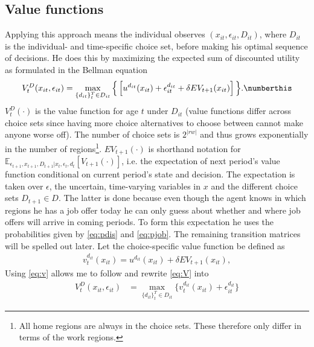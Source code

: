 \subsection{Value functions}
Applying this approach means the individual observes $(x_{it},\epsilon_{it}, D_{it})$, where $D_{it}$ is the individual- and time-specific choice set, before making his optimal sequence of decisions. He does this by maximizing the expected sum of discounted utility as formulated in the Bellman equation 
\begin{align}
V_t^D(x_{it},\epsilon_{it})=  \max_{\{d_{it}\}_{t}^{T}\in D_{it}} \Big\{\left[u^{d_{it}}(x_{it})+ \epsilon_{it}^{d_{it}}+\delta EV_{t+1}(x_{it}) \right]\Big\}. 
 \numberthis \label{eq:V}
\end{align}
$V_t^D(\cdot)$ is the value function for age $t$ under $D_{it}$ (value functions differ across choice sets since having more choice alternatives to choose between cannot make anyone worse off). The number of choice sets is $2^{|rw|}$ and thus grows exponentially in the number of regions\footnote{All home regions are always in the choice sets. These therefore only differ in terms of the work regions.}. $EV_{t+1}(\cdot)$ is shorthand notation for $\mathbb{E}_{\epsilon_{t+1},x_{t+1},D_{t+1}|x_t,\epsilon_t,d_t}[V_{t+1}(\cdot)]$, i.e. the expectation of next period's value function conditional on current period's state and decision. The expectation is taken over $\epsilon$, the uncertain, time-varying variables in $x$ and the different choice sets $D_{t+1}\in D$. The latter is done because even though the agent knows in which regions he has a job offer today he can only guess about whether and where job offers will arrive in coming periods. To form this expectation he uses the probabilities given by \eqref{eq:pdis} and \eqref{eq:pjob}. The remaining transition matrices will be spelled out later. Let the choice-specific value function be defined as 
\begin{align}
v_t^{d_{it}}(x_{it})= u^{d_{it}}(x_{it})+\delta EV_{t+1}(x_{it}), \label{eq:v} 
\end{align}
Using \eqref{eq:v} allows me to follow \citet{Rust1987} and rewrite \eqref{eq:V} into
\begin{align*}
V_t^D(x_{it},\epsilon_{it})&=\max_{\{d_{it}\}_{t}^{T}\in D_{it}} \{v_t^{d_{it}}(x_{it}) +\epsilon_{it}^{d_{it}}\}
\end{align*}
